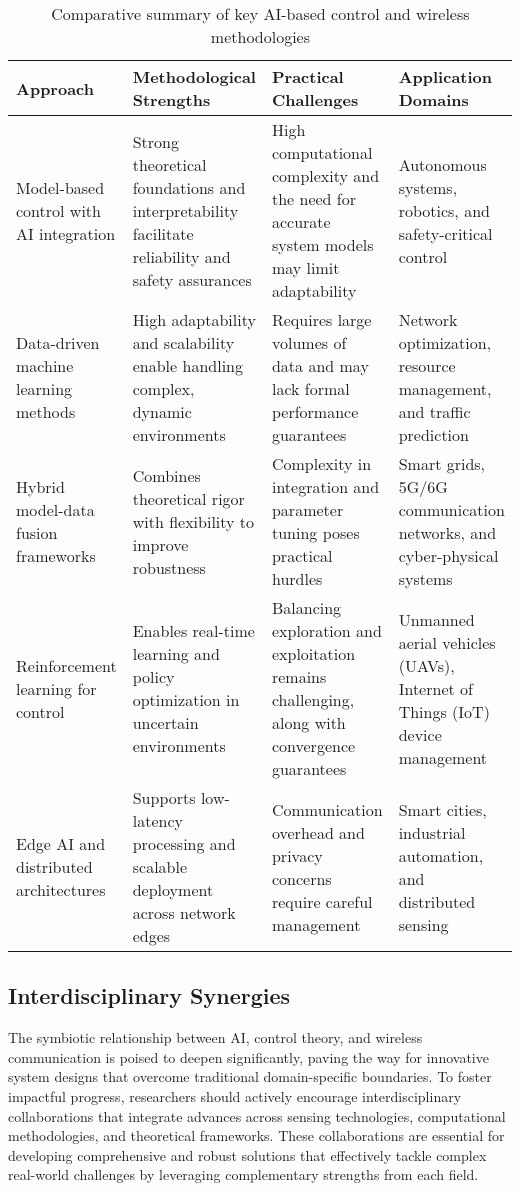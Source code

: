 \documentclass[sigconf]{acmart}
\begin{document}
\begin{table*}[htbp]
\centering
\caption{Comparative summary of key AI-based control and wireless methodologies}
\label{tab:approach_comparison}
\begin{adjustbox}{max width=\textwidth}
\begin{tabular}{@{}llll@{}}
\toprule
Approach & Methodological Strengths & Practical Challenges & Application Domains \\
\midrule
Model-based control with AI integration & Strong theoretical foundations and interpretability facilitate reliability and safety assurances & High computational complexity and the need for accurate system models may limit adaptability & Autonomous systems, robotics, and safety-critical control \\
Data-driven machine learning methods & High adaptability and scalability enable handling complex, dynamic environments & Requires large volumes of data and may lack formal performance guarantees & Network optimization, resource management, and traffic prediction \\
Hybrid model-data fusion frameworks & Combines theoretical rigor with flexibility to improve robustness & Complexity in integration and parameter tuning poses practical hurdles & Smart grids, 5G/6G communication networks, and cyber-physical systems \\
Reinforcement learning for control & Enables real-time learning and policy optimization in uncertain environments & Balancing exploration and exploitation remains challenging, along with convergence guarantees & Unmanned aerial vehicles (UAVs), Internet of Things (IoT) device management \\
Edge AI and distributed architectures & Supports low-latency processing and scalable deployment across network edges & Communication overhead and privacy concerns require careful management & Smart cities, industrial automation, and distributed sensing \\
\bottomrule
\end{tabular}
\end{adjustbox}
\end{table*}

\subsection{Interdisciplinary Synergies}

The symbiotic relationship between AI, control theory, and wireless communication is poised to deepen significantly, paving the way for innovative system designs that overcome traditional domain-specific boundaries. To foster impactful progress, researchers should actively encourage interdisciplinary collaborations that integrate advances across sensing technologies, computational methodologies, and theoretical frameworks. These collaborations are essential for developing comprehensive and robust solutions that effectively tackle complex real-world challenges by leveraging complementary strengths from each field.
\end{document}
